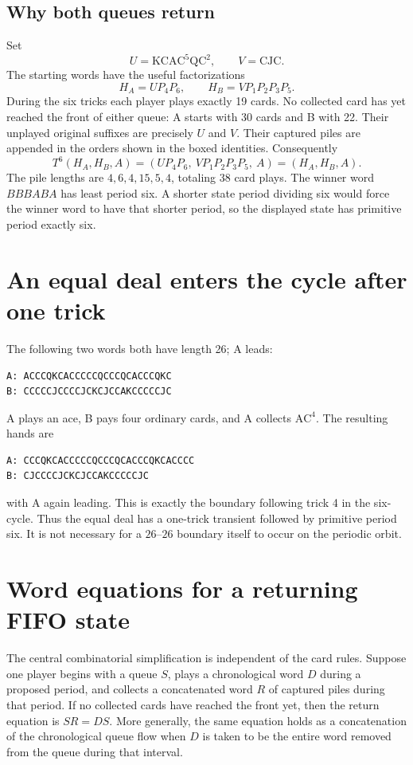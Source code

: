 \documentclass[11pt]{article}
\newcommand{\CC}{\mathrm C}
\newcommand{\JJ}{\mathrm J}
\newcommand{\QQ}{\mathrm Q}
\newcommand{\KK}{\mathrm K}
\renewcommand{\AA}{\mathrm A}
\begin{document}
\subsection{Why both queues return}

Set
\[
U=\KK\CC\AA\CC^5\QQ\CC^2,\qquad V=\CC\JJ\CC.
\]
The starting words have the useful factorizations
\[
\boxed{H_A=UP_4P_6,\qquad H_B=VP_1P_2P_3P_5.}
\]
During the six tricks each player plays exactly 19 cards. No collected card
has yet reached the front of either queue: A starts with 30 cards and B with
22. Their unplayed original suffixes are precisely $U$ and $V$. Their captured
piles are appended in the orders shown in the boxed identities. Consequently
\[
T^6(H_A,H_B,A)=(UP_4P_6,\ VP_1P_2P_3P_5,\ A)
             =(H_A,H_B,A).
\]
The pile lengths are $4,6,4,15,5,4$, totaling 38 card plays. The winner word
$BBBABA$ has least period six. A shorter state period dividing six would force
the winner word to have that shorter period, so the displayed state has
primitive period exactly six.

\section{An equal deal enters the cycle after one trick}

The following two words both have length 26; A leads:
\begin{verbatim}
A: ACCCQKCACCCCCQCCCQCACCCQKC
B: CCCCCJCCCCJCKCJCCAKCCCCCJC
\end{verbatim}
A plays an ace, B pays four ordinary cards, and A collects
$\AA\CC^4$. The resulting hands are
\begin{verbatim}
A: CCCQKCACCCCCQCCCQCACCCQKCACCCC
B: CJCCCCJCKCJCCAKCCCCCJC
\end{verbatim}
with A again leading. This is exactly the boundary following trick 4 in the
six-cycle. Thus the equal deal has a one-trick transient followed by primitive
period six. It is not necessary for a $26$--$26$ boundary itself to occur on
the periodic orbit.

\section{Word equations for a returning FIFO state}

The central combinatorial simplification is independent of the card rules.
Suppose one player begins with a queue $S$, plays a chronological word $D$
during a proposed period, and collects a concatenated word $R$ of captured
piles during that period. If no collected cards have reached the front yet,
then the return equation is $SR=DS$. More generally, the same equation holds
as a concatenation of the chronological queue flow when $D$ is taken to be
the entire word removed from the queue during that interval.
\end{document}
